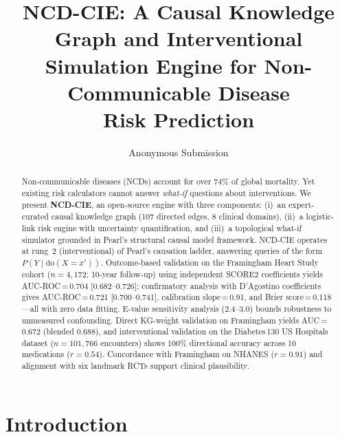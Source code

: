 \documentclass[runningheads]{llncs}
\begin{document}
\title{NCD-CIE: A Causal Knowledge Graph and Interventional\\Simulation Engine for Non-Communicable Disease\\Risk Prediction}

\author{Anonymous Submission}

\maketitle

\begin{abstract}
Non-communicable diseases (NCDs) account for over 74\% of global
mortality.
Yet existing risk calculators cannot answer \emph{what-if} questions
about interventions.
We present \textbf{NCD-CIE}, an open-source engine with three
components:
(i)~an expert-curated causal knowledge graph (107 directed edges,
8 clinical domains),
(ii)~a logistic-link risk engine with uncertainty quantification, and
(iii)~a topological what-if simulator grounded in Pearl's structural
causal model framework.
NCD-CIE operates at rung~2 (interventional) of Pearl's causation
ladder, answering queries of the form
$P(Y \mid \mathrm{do}(X\!=\!x'))$.
Outcome-based validation on the Framingham Heart Study cohort
($n\!=\!4{,}172$; 10-year follow-up) using independent SCORE2
coefficients yields AUC-ROC\,=\,0.704 [0.682--0.726]; confirmatory
analysis with D'Agostino coefficients gives
AUC-ROC\,=\,0.721 [0.700--0.741],
calibration slope\,=\,0.91, and Brier score\,=\,0.118---all with
zero data fitting.
E-value sensitivity analysis (2.4--3.0) bounds robustness to
unmeasured confounding.
Direct KG-weight validation on Framingham yields AUC\,=\,0.672
(blended 0.688), and interventional validation on the Diabetes\,130
US Hospitals dataset ($n\!=\!101{,}766$ encounters) shows 100\%
directional accuracy across 10 medications ($r\!=\!0.54$).
Concordance with Framingham on NHANES ($r\!=\!0.91$) and alignment
with six landmark RCTs support clinical plausibility.

\end{abstract}

\section{Introduction}\label{sec:intro}
\end{document}
